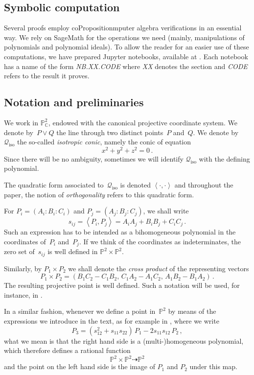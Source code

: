 \documentclass[a4paper, 11pt, reqno]{amsart}
\theoremstyle{plain}
\theoremstyle{definition}
\newcommand{\C}{\mathbb{C}}
\newcommand{\p}{\mathbb{P}}
\newcommand{\nb}[2]{\textsl{{NB}.{#1}.{#2}}}
\newcommand{\iso}{\mathcal{Q}_{\mathrm{iso}}}
\newcommand{\scl}[2]{\left\langle {#1}, {#2} \right\rangle}
\begin{document}
\subsection*{Symbolic computation}
Several proofs employ coPropositionmputer algebra verifications in an essential way.
We rely on SageMath \cite{SageMath} for the operations we need 
(mainly, manipulations of polynomials and polynomial ideals).
To allow the reader for an easier use of these computations, we have prepared Jupyter notebooks, available at \cite{Notebooks}.
Each notebook has a name of the form \nb{XX}{CODE} where \textit{XX} denotes the section and \textit{CODE} refers to the result it proves.

\subsection*{Notation and preliminaries}
We work in $\p^2_\C$, endowed with the canonical projective coordinate system.
We denote by~$P \vee Q$ the line through two distinct points~$P$ and~$Q$.
We denote by~$\iso$ the so-called \emph{isotropic conic}, namely the conic of equation
%
\[
 x^2 + y^2 + z^2 = 0 \,.
\]
%
Since there will be no ambiguity, sometimes we will identify $\iso$ with the 
defining polynomial.

The quadratic form associated to~$\iso$ is denoted $\left\langle \cdot, \cdot \right\rangle$ and throughout the paper, the notion of \emph{orthogonality} refers to this quadratic form.


For $P_i=(A_i:B_i:C_i)$ and $P_j=(A_j:B_j:C_j)$, we shall write
%
\[
  s_{ij} = \scl{P_i}{P_j} = A_i A_j + B_i B_j + C_i C_j \,.
\]
%
Such an expression has to be intended as a bihomogeneous polynomial in the coordinates of~$P_i$ and~$P_j$. If we think of the coordinates as indeterminates, the zero set of~$s_{ij}$ is well defined in $\p^2 \times \p^2$.

Similarly, by $P_1 \times P_2$ we shall denote the \emph{cross product} of the representing vectors
%
\begin{equation}\label{equation:cross product}
  P_1 \times P_2 = 
  (B_1 C_2 - C_1 B_2, \, C_1 A_2 - A_1 C_2, \, A_1 B_2 - B_1 A_2) \,.
\end{equation}
%
The resulting projective point is well defined. Such a notation will be used, for instance, in .

In a similar fashion, whenever we define a point in~$\p^2$ by means of the expressions we introduce in the text, as for example in , where we write
%
\[
  P_3 = (s_{12}^2+s_{11}s_{22}) \, P_1 - 2s_{11}s_{12} \, P_2 \,,
\]
%
what we mean is that the right hand side is a (multi-)homogeneous polynomial, which therefore defines a rational function
%
\[
  \p^2 \times \p^2 \dashrightarrow \p^2
\]
%
and the point on the left hand side is the image of $P_1$ and $P_2$ under this map.
\end{document}

